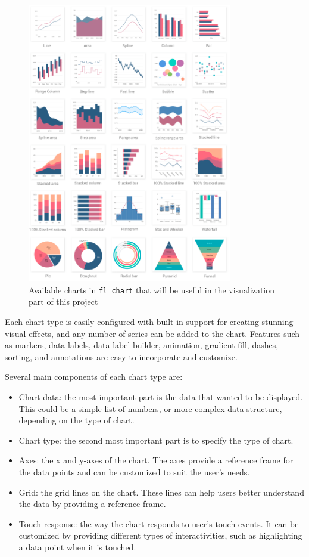 \begin{figure}[htbp]
      \centering
      \includegraphics[width=0.8\textwidth]{Figures/Charts.png}
      \caption{Available charts in \texttt{fl\_chart} that will be useful in the visualization part of this project}
      \label{fig:charts}
\end{figure}

Each chart type is easily configured with built-in support for creating stunning visual effects, and any
number of series can be added to the chart. Features such as markers, data labels, data label builder,
animation, gradient fill, dashes, sorting, and annotations are easy to incorporate and customize.

Several main components of each chart type are:
\begin{itemize}
      \item Chart data: the most important part is the data that wanted to be displayed. This could be a simple
            list of numbers, or more complex data structure, depending on the type of chart.
      \item Chart type: the second most important part is to specify the type of chart.
      \item Axes: the x and y-axes of the chart. The axes provide a reference frame for the data points and
            can be customized to suit the user's needs.
      \item Grid: the grid lines on the chart. These lines can help users better understand the data by
            providing a reference frame.
      \item Touch response: the way the chart responds to user's touch events. It can be customized by
            providing different types of interactivities, such as highlighting a data point when it is touched.
\end{itemize}

